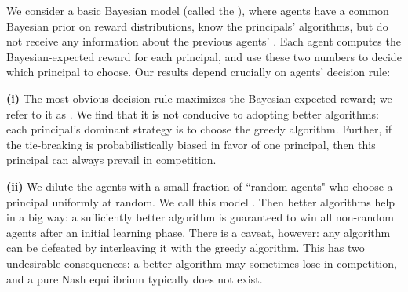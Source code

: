 

We consider a basic Bayesian model (called the \emph{\TheoryModel}), where agents have a common Bayesian prior on reward distributions, know the principals' algorithms, but do not receive any information about the previous agents' . Each agent computes the Bayesian-expected reward for each principal, and use these two numbers to decide which principal to choose.
Our results depend crucially on agents' decision rule:

\textbf{(i)} The most obvious decision rule maximizes the Bayesian-expected reward; we refer to it as \HardMax. We find that it is not conducive to adopting better algorithms: each principal's dominant strategy is to choose the greedy algorithm. Further,
if the tie-breaking is probabilistically biased in favor of one principal, then this principal can always prevail in competition.

\textbf{(ii)} We dilute the \HardMax agents with a small fraction of ``random agents" who choose a principal uniformly at random. We call this model \HardMaxRandom. Then better algorithms help in a big way: a sufficiently better algorithm is guaranteed to win all non-random agents after an initial learning phase. There is a caveat, however: any algorithm can be defeated by interleaving it with the greedy algorithm. This has two undesirable consequences: a better algorithm may sometimes lose in competition, and a pure Nash equilibrium typically does not exist.

